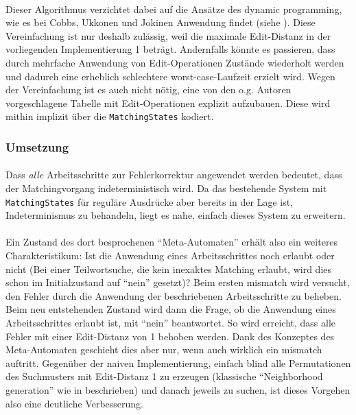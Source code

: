 \paragraph{} Dieser Algorithmus verzichtet dabei auf die Ansätze des dynamic programming, wie es bei Cobbs, Ukkonen und Jokinen Anwendung findet (siehe \cite{approxTreesUkkonen1, approxTreesUkkonen2,approxTreesCobbs}). Diese Vereinfachung ist nur deshalb zulässig, weil die maximale Edit-Distanz in der vorliegenden Implementierung 1 beträgt. Andernfalls könnte es passieren, dass durch mehrfache Anwendung von Edit-Operationen Zustände wiederholt werden und dadurch eine erheblich schlechtere worst-case-Laufzeit erzielt wird. Wegen der Vereinfachung ist es auch nicht nötig, eine von den o.g. Autoren vorgeschlagene Tabelle mit Edit-Operationen explizit aufzubauen. Diese wird mithin implizit über die \texttt{MatchingStates} kodiert.

\subsubsection{Umsetzung}

\paragraph{} Dass \textit{alle} Arbeitsschritte zur Fehlerkorrektur angewendet werden bedeutet, dass der Matchingvorgang indeterministisch wird. Da das bestehende System mit \texttt{MatchingStates} für reguläre Ausdrücke aber bereits in der Lage ist, Indeterminismus zu behandeln, liegt es nahe, einfach dieses System zu erweitern.
\paragraph{} Ein Zustand des dort besprochenen "`Meta-Automaten"' erhält also ein weiteres Charakteristikum: Ist die Anwendung eines Arbeitsschrittes noch erlaubt oder nicht (Bei einer Teilwortsuche, die kein inexaktes Matching erlaubt, wird dies schon im Initialzustand auf "`nein"' gesetzt)? Beim ersten mismatch wird versucht, den Fehler durch die Anwendung der beschriebenen Arbeitsschritte zu beheben. Beim neu entstehenden Zustand wird dann die Frage, ob die Anwendung eines Arbeitsschrittes erlaubt ist, mit "`nein"' beantwortet. So wird erreicht, dass alle Fehler mit einer Edit-Distanz von 1 behoben werden. Dank des Konzeptes des Meta-Automaten geschieht dies aber nur, wenn auch wirklich ein mismatch auftritt. Gegenüber der naiven Implementierung, einfach blind alle Permutationen des Suchmusters mit Edit-Distanz 1 zu erzeugen (klassische "`Neighborhood generation"' wie in \cite{approximateIndexing} beschrieben) und danach jeweils zu suchen, ist dieses Vorgehen also eine deutliche Verbesserung.
